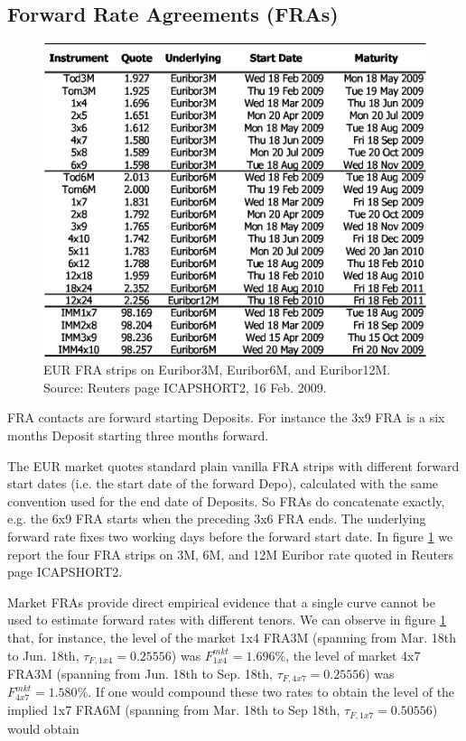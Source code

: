 \documentclass[11pt,reqno]{amsart}
\begin{document}
\subsection{Forward Rate Agreements (FRAs)}
\label{sec:FRA}
\begin{figure}[tbp]
\centering
\includegraphics[scale=0.9]{./FigMktFRA}
\caption{EUR FRA strips on Euribor3M, Euribor6M, and Euribor12M. Source: Reuters page ICAPSHORT2, 16 Feb. 2009.}
\label{fig:FRA}
\end{figure}
FRA contacts are forward starting Deposits. For instance the 3x9 FRA is a six months Deposit starting three months forward.
\par
The EUR market quotes standard plain vanilla FRA strips with different forward start dates (i.e. the start date of the forward Depo), calculated with the same convention used for the end date of Deposits. So FRAs do concatenate exactly, e.g. the 6x9 FRA starts when the preceding 3x6 FRA ends. The underlying forward rate fixes two working days before the forward start date.
In figure \ref{fig:FRA} we report the four FRA strips on 3M, 6M, and 12M Euribor rate quoted in Reuters page ICAPSHORT2.
\par
Market FRAs provide direct empirical evidence that a single curve cannot be used to estimate forward rates with different tenors. We can observe in figure \ref{fig:FRA} that, for instance, the level of the market 1x4 FRA3M (spanning from Mar. 18th to Jun. 18th, $\tau_{F,1x4} = 0.25556$) was $F_{1x4}^{mkt} = 1.696\%$, the level of market 4x7 FRA3M (spanning from Jun. 18th to Sep. 18th, $\tau_{F,4x7} = 0.25556$) was $F_{4x7}^{mkt}=1.580\%$. If one would compound these two rates to obtain the level of the implied 1x7 FRA6M (spanning from Mar. 18th to Sep 18th, $\tau_{F,1x7} = 0.50556$) would obtain
\end{document}
